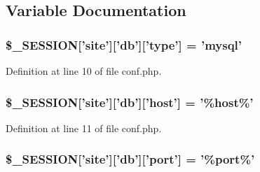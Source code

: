 \subsection{\-Variable \-Documentation}
\hypertarget{lib_2site__setup_2conf_8php_a3a4fa49ab6dddfa9c346db822685ecbe}{
\subsubsection[{\$\-\_\-\-S\-E\-S\-S\-I\-O\-N}]{\setlength{\rightskip}{0pt plus 5cm}\$\-\_\-\-S\-E\-S\-S\-I\-O\-N\mbox{[}'site'\mbox{]}\mbox{[}'db'\mbox{]}\mbox{[}'type'\mbox{]} = 'mysql'}}\label{lib_2site__setup_2conf_8php_a3a4fa49ab6dddfa9c346db822685ecbe}


\-Definition at line 10 of file conf.\-php.

\hypertarget{lib_2site__setup_2conf_8php_aa19fa0436dd2ec0b53315caa21c96832}{
\subsubsection[{\$\-\_\-\-S\-E\-S\-S\-I\-O\-N}]{\setlength{\rightskip}{0pt plus 5cm}\$\-\_\-\-S\-E\-S\-S\-I\-O\-N\mbox{[}'site'\mbox{]}\mbox{[}'db'\mbox{]}\mbox{[}'host'\mbox{]} = '\%host\%'}}\label{lib_2site__setup_2conf_8php_aa19fa0436dd2ec0b53315caa21c96832}


\-Definition at line 11 of file conf.\-php.

\hypertarget{lib_2site__setup_2conf_8php_afa8532c41f4264b9170e9e67f350eb32}{
\subsubsection[{\$\-\_\-\-S\-E\-S\-S\-I\-O\-N}]{\setlength{\rightskip}{0pt plus 5cm}\$\-\_\-\-S\-E\-S\-S\-I\-O\-N\mbox{[}'site'\mbox{]}\mbox{[}'db'\mbox{]}\mbox{[}'port'\mbox{]} = '\%port\%'}}\label{lib_2site__setup_2conf_8php_afa8532c41f4264b9170e9e67f350eb32}


